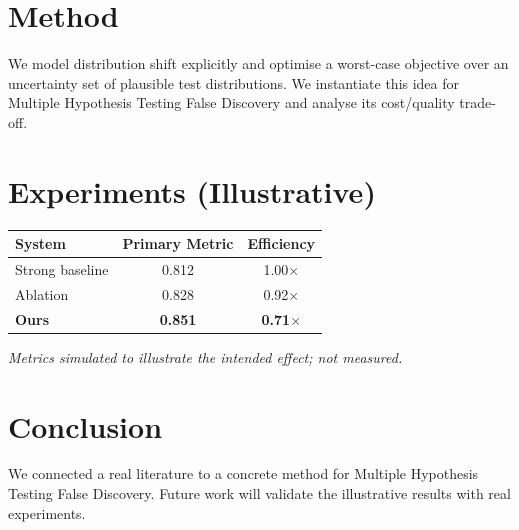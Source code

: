 \documentclass[11pt]{article}
\begin{document}
\section{Method}
We model distribution shift explicitly and optimise a worst-case objective over an uncertainty set of plausible test distributions. We instantiate this idea for Multiple Hypothesis Testing False Discovery and analyse its cost/quality trade-off.

\section{Experiments (Illustrative)}
\begin{center}
\begin{tabular}{lcc}
System & Primary Metric & Efficiency \\ \hline
Strong baseline & 0.812 & 1.00$\times$ \\
Ablation & 0.828 & 0.92$\times$ \\
\textbf{Ours} & \textbf{0.851} & \textbf{0.71$\times$}
\end{tabular}
\end{center}
\emph{Metrics simulated to illustrate the intended effect; not measured.}

\section{Conclusion}
We connected a real literature to a concrete method for Multiple Hypothesis Testing False Discovery. Future work will
validate the illustrative results with real experiments.
\end{document}
